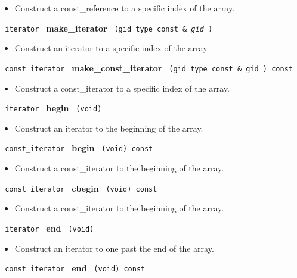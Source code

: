 \begin{itemize}
\item
Construct a const\_reference to a specific index of the array.
\end{itemize}
 
\noindent
\texttt{%
iterator
}
\textbf{make\_iterator}%
\texttt{%
(gid\_type const \&
\textit{gid}%
)
}

\begin{itemize}
\item
Construct an iterator to a specific index of the array.
\end{itemize}
 
\noindent
\texttt{%
const\_iterator 
}
\textbf{make\_const\_iterator}%
\texttt{%
(gid\_type const \&
gid
) const
}

\begin{itemize}
\item
Construct a const\_iterator to a specific index of the array.
\end{itemize}
 
\noindent
\texttt{%
iterator
}
\textbf{begin}%
\texttt{%
(void)
}

\begin{itemize}
\item
Construct an iterator to the beginning of the array.
\end{itemize}
 
\noindent
\texttt{%
const\_iterator
}
\textbf{begin}%
\texttt{%
(void) const
}

\begin{itemize}
\item
Construct a const\_iterator to the beginning of the array.
\end{itemize}
 
\noindent
\texttt{%
const\_iterator
}
\textbf{cbegin}%
\texttt{%
(void) const
}

\begin{itemize}
\item
Construct a const\_iterator to the beginning of the array.
\end{itemize}
 
\noindent
\texttt{%
iterator
}
\textbf{end}%
\texttt{%
(void)
}

\begin{itemize}
\item
Construct an iterator to one past the end of the array.
\end{itemize}
 
\noindent
\texttt{%
const\_iterator
}
\textbf{end}%
\texttt{%
(void) const
}

